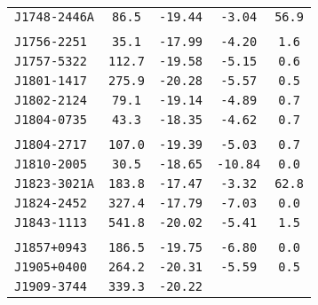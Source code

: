 \begin{longtable}{ l | c | c | c | c }
\scriptsize{\tt{J1748-2446A}} & \scriptsize{\tt{86.5}} & \scriptsize{\tt{-19.44}} &
\scriptsize{\tt{-3.04}} & \scriptsize{\tt{56.9}} \\[-16pt]
\\[-20pt] 
\scriptsize{\tt{J1756-2251}} & \scriptsize{\tt{35.1}} & \scriptsize{\tt{-17.99}} &
\scriptsize{\tt{-4.20}} & \scriptsize{\tt{1.6}} \\[-16pt]
\scriptsize{\tt{J1757-5322}} & \scriptsize{\tt{112.7}} & \scriptsize{\tt{-19.58}} &
\scriptsize{\tt{-5.15}} & \scriptsize{\tt{0.6}} \\[-16pt]
\scriptsize{\tt{J1801-1417}} & \scriptsize{\tt{275.9}} & \scriptsize{\tt{-20.28}} &
\scriptsize{\tt{-5.57}} & \scriptsize{\tt{0.5}} \\[-16pt]
\scriptsize{\tt{J1802-2124}} & \scriptsize{\tt{79.1}} & \scriptsize{\tt{-19.14}} &
\scriptsize{\tt{-4.89}} & \scriptsize{\tt{0.7}} \\[-16pt]
\scriptsize{\tt{J1804-0735}} & \scriptsize{\tt{43.3}} & \scriptsize{\tt{-18.35}} &
\scriptsize{\tt{-4.62}} & \scriptsize{\tt{0.7}} \\[-16pt]
\\[-20pt] 
\scriptsize{\tt{J1804-2717}} & \scriptsize{\tt{107.0}} & \scriptsize{\tt{-19.39}} &
\scriptsize{\tt{-5.03}} & \scriptsize{\tt{0.7}} \\[-16pt]
\scriptsize{\tt{J1810-2005}} & \scriptsize{\tt{30.5}} & \scriptsize{\tt{-18.65}} &
\scriptsize{\tt{-10.84}} & \scriptsize{\tt{0.0}} \\[-16pt]
\scriptsize{\tt{J1823-3021A}} & \scriptsize{\tt{183.8}} & \scriptsize{\tt{-17.47}} &
\scriptsize{\tt{-3.32}} & \scriptsize{\tt{62.8}} \\[-16pt]
\scriptsize{\tt{J1824-2452}} & \scriptsize{\tt{327.4}} & \scriptsize{\tt{-17.79}} &
\scriptsize{\tt{-7.03}} & \scriptsize{\tt{0.0}} \\[-16pt]
\scriptsize{\tt{J1843-1113}} & \scriptsize{\tt{541.8}} & \scriptsize{\tt{-20.02}} &
\scriptsize{\tt{-5.41}} & \scriptsize{\tt{1.5}} \\[-16pt]
\\[-20pt] 
\scriptsize{\tt{J1857+0943}} & \scriptsize{\tt{186.5}} & \scriptsize{\tt{-19.75}} &
\scriptsize{\tt{-6.80}} & \scriptsize{\tt{0.0}} \\[-16pt]
\scriptsize{\tt{J1905+0400}} & \scriptsize{\tt{264.2}} & \scriptsize{\tt{-20.31}} &
\scriptsize{\tt{-5.59}} & \scriptsize{\tt{0.5}} \\[-16pt]
\scriptsize{\tt{J1909-3744}} & \scriptsize{\tt{339.3}} & \scriptsize{\tt{-20.22}} &

\end{longtable}
